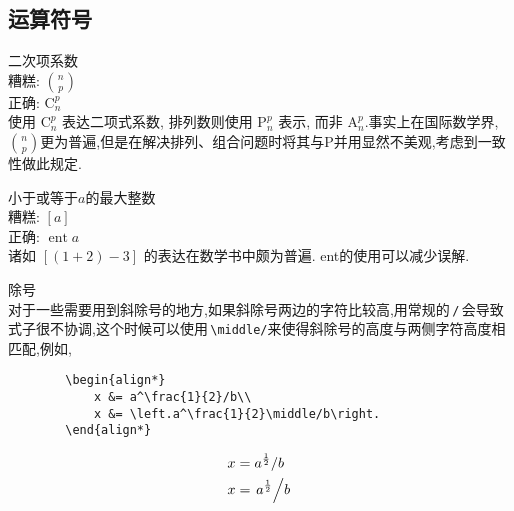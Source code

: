 \documentclass[a4paper]{article}
\begin{document}
\subsection{运算符号}
\begin{compactitem}[\hspace{1.02em}$\bullet$]
	\item 二次项系数\\
	\textsf{糟糕}: ${n}\choose{p}$\\
	\textsf{正确}: $\mathrm{C}_{n}^{p}$\\
	使用 $\mathrm{C}_{n}^{p}$ 表达二项式系数, 排列数则使用 $\mathrm{P}_{n}^{p}$ 表示, 而非 $\mathrm{A}_{n}^{p}$.事实上在国际数学界, ${n}\choose{p}$更为普遍,但是在解决排列、组合问题时将其与P并用显然不美观,考虑到一致性做此规定.\eop
	\item 小于或等于$a$的最大整数\\
	\textsf{糟糕}: $[a]$\\
	\textsf{正确}: $\operatorname{ent} a$\\
	诸如 $[(1+2)-3]$ 的表达在数学书中颇为普遍. ent的使用可以减少误解.
	\item 除号\\
	对于一些需要用到斜除号的地方,如果斜除号两边的字符比较高,用常规的\,\verb|/|\,会导致式子很不协调,这个时候可以使用\,\verb|\middle/|来使得斜除号的高度与两侧字符高度相匹配,例如,\eop
	\begin{verbatim}
		\begin{align*}
			x &= a^\frac{1}{2}/b\\
			x &= \left.a^\frac{1}{2}\middle/b\right.
		\end{align*}
	\end{verbatim}
	\begin{align*}
	x &= a^\frac{1}{2}/b\\
	x &= \left.a^\frac{1}{2}\middle/b\right.
	\end{align*}
\end{compactitem}
\end{document}
